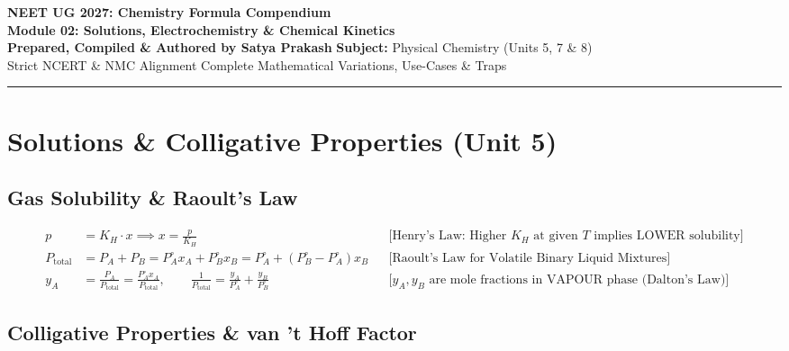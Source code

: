 \documentclass[11pt,a4paper]{article}
\begin{document}
\begin{center}
  {\huge\bfseries\color{primarydark} NEET UG 2027: Chemistry Formula Compendium}\\[6pt]
  {\Large\bfseries\color{accentblue} Module 02: Solutions, Electrochemistry \& Chemical Kinetics}\\[8pt]
  {\normalsize\textbf{Prepared, Compiled \& Authored by Satya Prakash} \quad\textbar\quad \textbf{Subject:} Physical Chemistry (Units 5, 7 \& 8)}\\[4pt]
  {\footnotesize\color{gray} Strict NCERT \& NMC Alignment \quad\textbar\quad Complete Mathematical Variations, Use-Cases \& Traps}
\end{center}
\vspace{-2pt}
\hrule height 1.2pt
\vspace{8pt}

\section{Solutions \& Colligative Properties (Unit 5)}

\subsection{Gas Solubility \& Raoult's Law}

\begin{formulabox}
\begin{align}
  p &= K_H \cdot x \implies x = \frac{p}{K_H} && \text{[Henry's Law: Higher $K_H$ at given $T$ implies LOWER solubility]} \\
  P_{\text{total}} &= P_A + P_B = P_A^\circ x_A + P_B^\circ x_B = P_A^\circ + (P_B^\circ - P_A^\circ)x_B && \text{[Raoult's Law for Volatile Binary Liquid Mixtures]} \\
  y_A &= \frac{P_A}{P_{\text{total}}} = \frac{P_A^\circ x_A}{P_{\text{total}}}, \qquad \frac{1}{P_{\text{total}}} = \frac{y_A}{P_A^\circ} + \frac{y_B}{P_B^\circ} && \text{[$y_A, y_B$ are mole fractions in VAPOUR phase (Dalton's Law)]}
\end{align}
\end{formulabox}

\subsection{Colligative Properties \& van 't Hoff Factor}
\end{document}
